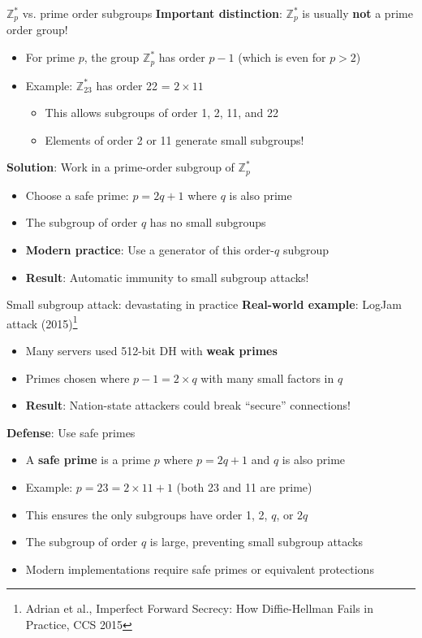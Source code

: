 \documentclass[aspectratio=169, lualatex, handout]{beamer}
\begin{document}
\begin{frame}{$\mathbb{Z}_p^*$ vs. prime order subgroups}
	\textbf{Important distinction}: $\mathbb{Z}_p^*$ is usually \textbf{not} a prime order group!
	\begin{itemize}[<+->]
		\item For prime $p$, the group $\mathbb{Z}_p^*$ has order $p - 1$ (which is even for $p > 2$)
		\item Example: $\mathbb{Z}_{23}^*$ has order 22 = $2 \times 11$
		      \begin{itemize}
			      \item This allows subgroups of order 1, 2, 11, and 22
			      \item Elements of order 2 or 11 generate small subgroups!
		      \end{itemize}
	\end{itemize}
	\vspace{0.5cm}
	\textbf{Solution}: Work in a prime-order subgroup of $\mathbb{Z}_p^*$
	\begin{itemize}[<+->]
		\item Choose a safe prime: $p = 2q + 1$ where $q$ is also prime
		\item The subgroup of order $q$ has no small subgroups
		\item \textbf{Modern practice}: Use a generator of this order-$q$ subgroup
		\item \textbf{Result}: Automatic immunity to small subgroup attacks!
	\end{itemize}
\end{frame}

\begin{frame}{Small subgroup attack: devastating in practice}
	\textbf{Real-world example}: LogJam attack (2015)\footnote{Adrian et al., Imperfect Forward Secrecy: How Diffie-Hellman Fails in Practice, CCS 2015}
	\begin{itemize}[<+->]
		\item Many servers used 512-bit DH with \textbf{weak primes}
		\item Primes chosen where $p - 1 = 2 \times q$ with many small factors in $q$
		\item \textbf{Result}: Nation-state attackers could break ``secure'' connections!
	\end{itemize}
	\vspace{0.5cm}
	\textbf{Defense}: Use safe primes
	\begin{itemize}[<+->]
		\item A \textbf{safe prime} is a prime $p$ where $p = 2q + 1$ and $q$ is also prime
		\item Example: $p = 23 = 2 \times 11 + 1$ (both 23 and 11 are prime)
		\item This ensures the only subgroups have order 1, 2, $q$, or $2q$
		\item The subgroup of order $q$ is large, preventing small subgroup attacks
		\item Modern implementations require safe primes or equivalent protections
	\end{itemize}
\end{frame}
\end{document}
